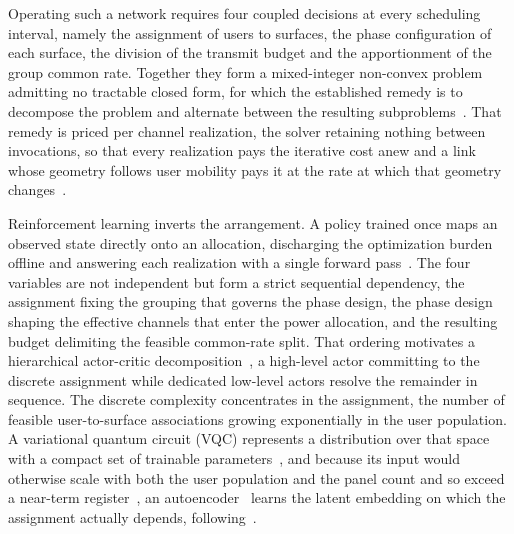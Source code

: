\documentclass[12pt,onecolumn]{IEEEtran}
\begin{document}
Operating such a network requires four coupled decisions at every scheduling interval,
namely the assignment of users to surfaces, the phase configuration of each surface, the
division of the transmit budget and the apportionment of the group common rate. Together they form a
mixed-integer non-convex problem admitting no tractable closed form, for which the
established remedy is to decompose the problem and alternate between the resulting
subproblems~\cite{luo2008dynamic,luo2010semidefinite}. That remedy is priced per channel realization, the solver retaining nothing between
invocations, so that every realization pays the iterative cost anew and a link whose
geometry follows user mobility pays it at the rate at which that geometry
changes~\cite{meng2023sum}.

Reinforcement learning inverts the arrangement. A policy trained once maps an observed
state directly onto an allocation, discharging the optimization burden offline and
answering each realization with a single forward
pass~\cite{sutton2018reinforcement,sun2018learning}. The four variables are not
independent but form a strict sequential dependency, the assignment fixing the grouping
that governs the phase design, the phase design shaping the effective channels that enter
the power allocation, and the resulting budget delimiting the feasible common-rate split.
That ordering motivates a hierarchical actor-critic
decomposition~\cite{levy2019learning,gong2023hierarchical}, a high-level actor committing
to the discrete assignment while dedicated low-level actors resolve the remainder in
sequence. The discrete complexity concentrates in the assignment, the number of feasible
user-to-surface associations growing exponentially in the user population. A variational
quantum circuit (VQC) represents a distribution over that space with a compact set of
trainable parameters~\cite{jerbi2021parametrized}, and because its input would otherwise
scale with both the user population and the panel count and so exceed a near-term
register~\cite{preskill2018quantum}, an autoencoder~\cite{hinton2006reducing} learns the
latent embedding on which the assignment actually depends,
following~\cite{nagy2025hybrid}.
\end{document}
